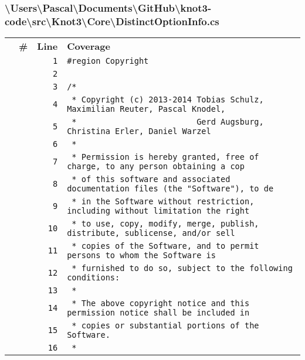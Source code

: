 \documentclass[a4paper,10pt]{article}
\begin{document}
\subsubsection{\textbackslash Users\textbackslash Pascal\textbackslash Documents\textbackslash GitHub\textbackslash knot3-code\textbackslash src\textbackslash Knot3\textbackslash Core\textbackslash DistinctOptionInfo.cs}
\begin{longtable}[l]{lrrl}
\textbf{} & \textbf{\#} & \textbf{Line} & \textbf{Coverage}\\
\cellcolor{gray} &  & \verb~1~ & \verb~#region Copyright~\\
\cellcolor{gray} &  & \verb~2~ & \verb~~\\
\cellcolor{gray} &  & \verb~3~ & \verb~/*~\\
\cellcolor{gray} &  & \verb~4~ & \verb~ * Copyright (c) 2013-2014 Tobias Schulz, Maximilian Reuter, Pascal Knodel,~\\
\cellcolor{gray} &  & \verb~5~ & \verb~ *                         Gerd Augsburg, Christina Erler, Daniel Warzel~\\
\cellcolor{gray} &  & \verb~6~ & \verb~ *~\\
\cellcolor{gray} &  & \verb~7~ & \verb~ * Permission is hereby granted, free of charge, to any person obtaining a cop~\\
\cellcolor{gray} &  & \verb~8~ & \verb~ * of this software and associated documentation files (the "Software"), to de~\\
\cellcolor{gray} &  & \verb~9~ & \verb~ * in the Software without restriction, including without limitation the right~\\
\cellcolor{gray} &  & \verb~10~ & \verb~ * to use, copy, modify, merge, publish, distribute, sublicense, and/or sell~\\
\cellcolor{gray} &  & \verb~11~ & \verb~ * copies of the Software, and to permit persons to whom the Software is~\\
\cellcolor{gray} &  & \verb~12~ & \verb~ * furnished to do so, subject to the following conditions:~\\
\cellcolor{gray} &  & \verb~13~ & \verb~ *~\\
\cellcolor{gray} &  & \verb~14~ & \verb~ * The above copyright notice and this permission notice shall be included in ~\\
\cellcolor{gray} &  & \verb~15~ & \verb~ * copies or substantial portions of the Software.~\\
\cellcolor{gray} &  & \verb~16~ & \verb~ *~\\

\end{longtable}
\end{document}
